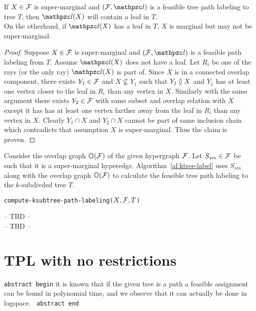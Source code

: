 \begin{lemma}
  \label{lem:sup-mar}
  If $X \in {\cal F}$ is super-marginal and $(\cF, \cl)$ is a feasible tree
  path labeling to tree $T$, then $\cl(X)$ will
  contain a leaf in $T$.\\
  On the otherhand, if $\cl(X)$ has a leaf in $T$, $X$ is marginal but
  may not be super-marginal.
\end{lemma}
\begin{proof}
  Suppose $X \in {\cal F}$ is super-marginal and $(\cF, \cl)$ is a feasible
  path labeling from $T$.  Assume $\cl(X)$ does not have a leaf.  Let
  $R_i$ be one of the rays (or the only ray) $\cl(X)$ is part of.
  Since $X$ is in a connected overlap component, there exists $Y_1 \in
  {\cal F}$ and $X \nsubseteq Y_1$ such that $Y_1 \between X$ and $Y_1$ has
  at least one vertex closer to the leaf in $R_i$ than any vertex in
  $X$. Similarly with the same argument there exists $Y_2 \in {\cal F}$
  with same subset and overlap relation with $X$ except it has has at
  least one vertex farther away from the leaf in $R_i$ than any vertex
  in $X$. Clearly $Y_1 \cap X$ and $Y_2 \cap X$ cannot be part of same
  inclusion chain which contradicts that assumption $X$ is
  super-marginal. Thus the claim is proven.%
\end{proof}

\noindent
Consider the overlap graph $\mathbb O({\cal F})$ of the given hypergraph
${\cal F}$. Let $S_{sm} \in {\cal F}$ be such that it is a super-marginal
hyperedge.  Algorithm~\ref{al:ktree-label} uses $S_{sm}$ along with
the overlap graph $\mathbb O({\cal F})$ to calculate the feasible tree path
labeling to the $k$-subdivded tree $T$.

\begin{algorithm}[h]
  \caption{{\tt compute-ksubtree-path-labeling($X, {\cal F}, T$)}}
  \label{al:ktree-label}
  \begin{algorithmic}[\lndisplay]
    \STATE -- TBD --\\
    \ELSE
    \STATE -- TBD --\\
    \ENDIF

  \end{algorithmic}
\end{algorithm}


\section{ TPL with no restrictions}
\label{sec:norestraint}

{\tt abstract begin} it is known that if the given tree is a path a
feasible assignment can be found in polynomial time, and we observe
that it can actually be done in logspace. \tnote{[TRUE?]}  {\tt
  abstract end}


